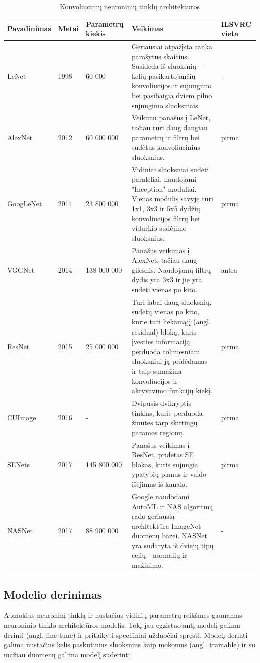 \documentclass{VUMIFPSbakalaurinis}
\begin{document}
\begin{longtable}[h]{ | p{2cm} | p{1cm} | p{3cm} | p{7cm} | p{1.5cm} | } 
\caption{Konvoliucinių neuroninių tinklų architektūros} \\
\hline
Pavadinimas & Metai & Parametrų kiekis & Veikimas & ILSVRC vieta \\
\hline
\endhead
LeNet & 1998 & 60 000 & Geriausiai atpažįsta ranka parašytus skaičius. Susideda iš sluoksnių - kelių pasikartojančių konvoliucijos ir sujungimo bei pasibaigia dviem pilno sujungimo sluoksniais. & - \\
\hline
AlexNet & 2012 & 60 000 000 & Veikimu panašus į LeNet, tačiau turi daug daugiau parametrų ir filtrų bei sudėtus konvoliucinius sluoksnius.  & pirma \\
\hline
GoogLeNet & 2014 & 23 800 000 & Vidiniai sluoksniai sudėti paraleliai, naudojami "Inception" moduliai. Vienas modulis savyje turi 1x1, 3x3 ir 5x5 dydžių konvoliucijos filtrų bei vidurkio sudėjimo sluoksnius. & pirma \\
\hline
VGGNet & 2014 & 138 000 000 & Panašus veikimas į AlexNet, tačiau daug gilesnis. Naudojamų filtrų dydis yra 3x3 ir jie yra sudėti vienas po kito. & antra \\
\hline
ResNet & 2015 & 25 000 000 & Turi labai daug sluoksnių, sudėtų vienas po kito, kurie turi liekamąjį (angl. residual) bloką, kuris įvesties informaciją perduoda tolimesniam sluoksniui ją pridėdamas ir taip sumažina konvoliucijos ir aktyvavimo funkcijų kiekį.  & pirma \\
\hline
CUImage & 2016 & - & Dvipusis dvikryptis tinklas, kuris perduoda žinutes tarp skirtingų paramos regionų. & pirma \\
\hline
SENets & 2017 & 145 800 000 & Panašus veikimas į ResNet, pridėtas SE blokas, kuris sujungia ypatybių planus ir valdo išėjimus iš kanalo.  & pirma \\
\hline
NASNet & 2017 & 88 900 000 & Google naudodami AutoML ir NAS algoritmą rado geriausią architektūra ImageNet duomenų bazei. NASNet yra sudaryta iš dviejų tipų celių - normalių ir mažinimo. & - \\ 
\hline
\end{longtable}

\subsection{Modelio derinimas}
Apmokius neuroninį tinklą ir nustačius vidinių parametrų reikšmes gaunamas neuroninio tinklo architektūros modelis. Tokį jau egzistuojantį modelį galima derinti (angl. fine-tune) 
ir pritaikyti specifiniai užduočiai spręsti. Modelį derinti galima nustačius kelis paskutinius sluoksnius kaip mokomus (angl. trainable) ir su mažiau duomenų galima modelį suderinti.
\end{document}
